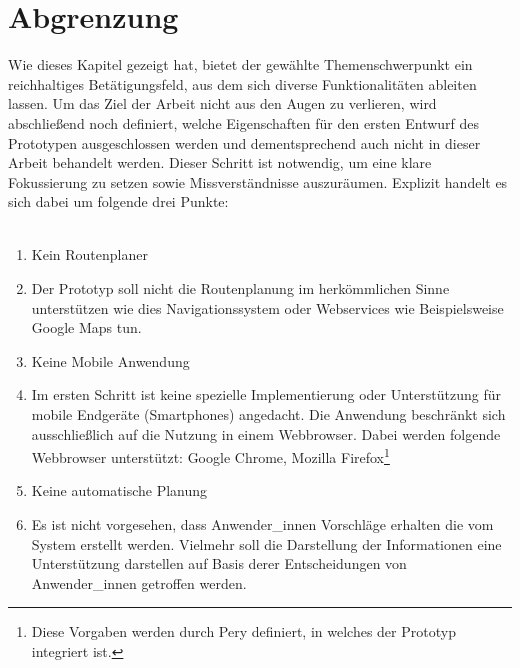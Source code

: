 \documentclass[Bachelorarbeit.tex]{subfiles}
\begin{document}
\section{Abgrenzung}
Wie dieses Kapitel gezeigt hat, bietet der gewählte Themenschwerpunkt ein reichhaltiges Betätigungsfeld, aus dem sich diverse Funktionalitäten ableiten lassen. 
Um das Ziel der Arbeit nicht aus den Augen zu verlieren, wird abschließend noch definiert, welche Eigenschaften für den ersten Entwurf des Prototypen ausgeschlossen werden und dementsprechend auch nicht in dieser Arbeit behandelt werden. 
Dieser Schritt ist notwendig, um eine klare Fokussierung zu setzen sowie Missverständnisse auszuräumen.
Explizit handelt es sich dabei um folgende drei Punkte:\\
\\
\begin{enumerate}
	\item Kein Routenplaner
	\item[] Der Prototyp soll nicht die Routenplanung im herkömmlichen Sinne unterstützen wie dies Navigationssystem oder Webservices wie Beispielsweise Google Maps tun.
	\item Keine Mobile Anwendung
	\item [] Im ersten Schritt ist keine spezielle Implementierung oder Unterstützung für mobile Endgeräte (Smartphones) angedacht. Die Anwendung beschränkt sich ausschließlich auf die Nutzung in einem Webbrowser. Dabei werden folgende Webbrowser unterstützt: Google Chrome, Mozilla Firefox\footnote{Diese Vorgaben werden durch Pery definiert, in welches der Prototyp integriert ist.}
	\item Keine automatische Planung
	\item[] Es ist nicht vorgesehen, dass Anwender\_innen Vorschläge erhalten die vom System erstellt werden. Vielmehr soll die Darstellung der Informationen eine Unterstützung darstellen auf Basis derer Entscheidungen von Anwender\_innen getroffen werden.
\end{enumerate}
\end{document}
